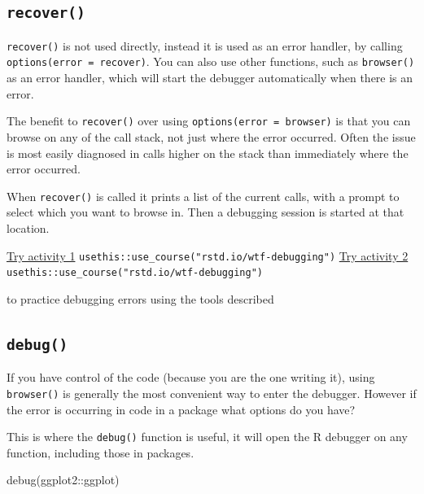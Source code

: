 \documentclass[
  letterpaper,
]{book}
\newenvironment{Shaded}{\begin{snugshade}}{\end{snugshade}}
\newcommand{\FunctionTok}[1]{\textcolor[rgb]{0.28,0.35,0.67}{#1}}
\newcommand{\NormalTok}[1]{\textcolor[rgb]{0.00,0.23,0.31}{#1}}
\newcommand{\SpecialCharTok}[1]{\textcolor[rgb]{0.37,0.37,0.37}{#1}}
\begin{document}
\hypertarget{recover}{%
\subsection*{\texorpdfstring{\texttt{recover()}}{recover()}}\label{recover}}

\texttt{recover()} is not used directly, instead it is used as an error
handler, by calling \texttt{options(error\ =\ recover)}. You can also
use other functions, such as \texttt{browser()} as an error handler,
which will start the debugger automatically when there is an error.

The benefit to \texttt{recover()} over using
\texttt{options(error\ =\ browser)} is that you can browse on any of the
call stack, not just where the error occurred. Often the issue is most
easily diagnosed in calls higher on the stack than immediately where the
error occurred.

When \texttt{recover()} is called it prints a list of the current calls,
with a prompt to select which you want to browse in. Then a debugging
session is started at that location.

\begin{rmdinfo}
\href{https://raw.githubusercontent.com/jimhester/wtf-debugging/master/01_debugging_spartan.R}{Try
activity 1} \texttt{usethis::use\_course("rstd.io/wtf-debugging")}
\href{https://raw.githubusercontent.com/jimhester/wtf-debugging/master/02_debugging_spartan.R}{Try
activity 2} \texttt{usethis::use\_course("rstd.io/wtf-debugging")}

to practice debugging errors using the tools described
\end{rmdinfo}

\hypertarget{debug}{%
\subsection*{\texorpdfstring{\texttt{debug()}}{debug()}}\label{debug}}

If you have control of the code (because you are the one writing it),
using \texttt{browser()} is generally the most convenient way to enter
the debugger. However if the error is occurring in code in a package
what options do you have?

This is where the \texttt{debug()} function is useful, it will open the
R debugger on any function, including those in packages.

\begin{Shaded}
\begin{Highlighting}[]
\FunctionTok{debug}\NormalTok{(ggplot2}\SpecialCharTok{::}\NormalTok{ggplot)}
\end{Highlighting}
\end{Shaded}
\end{document}
